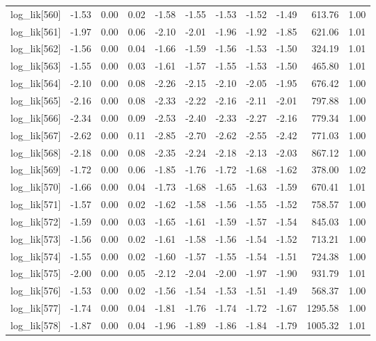 \begin{table}[ht]
\begin{tabular}{rrrrrrrrrrr}
  log\_lik[560] & -1.53 & 0.00 & 0.02 & -1.58 & -1.55 & -1.53 & -1.52 & -1.49 & 613.76 & 1.00 \\ 
  log\_lik[561] & -1.97 & 0.00 & 0.06 & -2.10 & -2.01 & -1.96 & -1.92 & -1.85 & 621.06 & 1.01 \\ 
  log\_lik[562] & -1.56 & 0.00 & 0.04 & -1.66 & -1.59 & -1.56 & -1.53 & -1.50 & 324.19 & 1.01 \\ 
  log\_lik[563] & -1.55 & 0.00 & 0.03 & -1.61 & -1.57 & -1.55 & -1.53 & -1.50 & 465.80 & 1.01 \\ 
  log\_lik[564] & -2.10 & 0.00 & 0.08 & -2.26 & -2.15 & -2.10 & -2.05 & -1.95 & 676.42 & 1.00 \\ 
  log\_lik[565] & -2.16 & 0.00 & 0.08 & -2.33 & -2.22 & -2.16 & -2.11 & -2.01 & 797.88 & 1.00 \\ 
  log\_lik[566] & -2.34 & 0.00 & 0.09 & -2.53 & -2.40 & -2.33 & -2.27 & -2.16 & 779.34 & 1.00 \\ 
  log\_lik[567] & -2.62 & 0.00 & 0.11 & -2.85 & -2.70 & -2.62 & -2.55 & -2.42 & 771.03 & 1.00 \\ 
  log\_lik[568] & -2.18 & 0.00 & 0.08 & -2.35 & -2.24 & -2.18 & -2.13 & -2.03 & 867.12 & 1.00 \\ 
  log\_lik[569] & -1.72 & 0.00 & 0.06 & -1.85 & -1.76 & -1.72 & -1.68 & -1.62 & 378.00 & 1.02 \\ 
  log\_lik[570] & -1.66 & 0.00 & 0.04 & -1.73 & -1.68 & -1.65 & -1.63 & -1.59 & 670.41 & 1.01 \\ 
  log\_lik[571] & -1.57 & 0.00 & 0.02 & -1.62 & -1.58 & -1.56 & -1.55 & -1.52 & 758.57 & 1.00 \\ 
  log\_lik[572] & -1.59 & 0.00 & 0.03 & -1.65 & -1.61 & -1.59 & -1.57 & -1.54 & 845.03 & 1.00 \\ 
  log\_lik[573] & -1.56 & 0.00 & 0.02 & -1.61 & -1.58 & -1.56 & -1.54 & -1.52 & 713.21 & 1.00 \\ 
  log\_lik[574] & -1.55 & 0.00 & 0.02 & -1.60 & -1.57 & -1.55 & -1.54 & -1.51 & 724.38 & 1.00 \\ 
  log\_lik[575] & -2.00 & 0.00 & 0.05 & -2.12 & -2.04 & -2.00 & -1.97 & -1.90 & 931.79 & 1.01 \\ 
  log\_lik[576] & -1.53 & 0.00 & 0.02 & -1.56 & -1.54 & -1.53 & -1.51 & -1.49 & 568.37 & 1.00 \\ 
  log\_lik[577] & -1.74 & 0.00 & 0.04 & -1.81 & -1.76 & -1.74 & -1.72 & -1.67 & 1295.58 & 1.00 \\ 
  log\_lik[578] & -1.87 & 0.00 & 0.04 & -1.96 & -1.89 & -1.86 & -1.84 & -1.79 & 1005.32 & 1.01 \\ 

\end{tabular}
\end{table}
